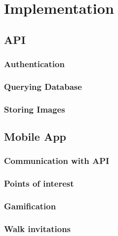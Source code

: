 \chapter{Implementation}


\section{API}

\subsection{Authentication}

\subsection{Querying Database}

\subsection{Storing Images} \label{implentation:storing-images}


\section{Mobile App}

\subsection{Communication with API}

\subsection{Points of interest}

\subsection{Gamification} \label{subsection:gamification}


\subsection{Walk invitations}